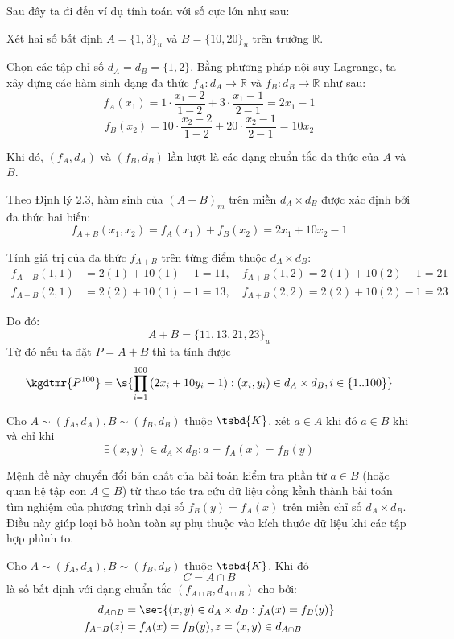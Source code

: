 \par{\noindent Sau đây ta đi đến ví dụ tính toán với số cực lớn như sau:}
\begin{example}
	Xét hai số bất định $A = \{1, 3\}_u$ và $B = \{10, 20\}_u$ trên trường $\mathbb{R}$.
	
	Chọn các tập chỉ số $d_A = d_B = \{1, 2\}$. Bằng phương pháp nội suy Lagrange, ta xây dựng các hàm sinh dạng đa thức $f_A: d_A \to \mathbb{R}$ và $f_B: d_B \to \mathbb{R}$ như sau:
	$$f_A(x_1) = 1 \cdot \frac{x_1 - 2}{1 - 2} + 3 \cdot \frac{x_1 - 1}{2 - 1} = 2x_1 - 1$$
	$$f_B(x_2) = 10 \cdot \frac{x_2 - 2}{1 - 2} + 20 \cdot \frac{x_2 - 1}{2 - 1} = 10x_2$$
	
	Khi đó, $(f_A, d_A)$ và $(f_B, d_B)$ lần lượt là các dạng chuẩn tắc đa thức của $A$ và $B$.
	
	Theo Định lý 2.3, hàm sinh của $(A + B)_m$ trên miền $d_A \times d_B$ được xác định bởi đa thức hai biến:
	$$f_{A+B}(x_1, x_2) = f_A(x_1) + f_B(x_2) = 2x_1 + 10x_2 - 1$$
	
	Tính giá trị của đa thức $f_{A+B}$ trên từng điểm thuộc $d_A \times d_B$:
	\begin{align*}
		f_{A+B}(1, 1) &= 2(1) + 10(1) - 1 = 11, \quad f_{A+B}(1, 2) = 2(1) + 10(2) - 1 = 21 \\
		f_{A+B}(2, 1) &= 2(2) + 10(1) - 1 = 13, \quad f_{A+B}(2, 2) = 2(2) + 10(2) - 1 = 23
	\end{align*}
	
	Do đó:
	$$ A + B = \{11, 13, 21, 23\}_u$$
	Từ đó nếu ta đặt $ P = A+B$ thì ta tính được \[\kgdtmr{P^{100}} = \s{\prod_{i=1}^{100}{(2x_i + 10 y_i  - 1)}: (x_i,y_i) \in d_A \times d_B, i \in \{1..100\}}
	\]
\end{example}
\begin{proposition}
	Cho $A \sim (f_A,d_A), B \sim (f_B,d_B)$ thuộc $\tsbd{K}$, xét $a \in A$ khi đó $a \in B$ khi và chỉ khi \[
	\exists (x,y) \in d_A \times d_B : a=f_A(x)=f_B(y)
	\]
\end{proposition}
\begin{remark}
	Mệnh đề này chuyển đổi bản chất của bài toán kiểm tra phần tử $a \in B$ (hoặc quan hệ tập con $A \subseteq B$) từ thao tác tra cứu dữ liệu cồng kềnh thành bài toán tìm nghiệm của phương trình đại số $f_B(y) = f_A(x)$ trên miền chỉ số $d_A \times d_B$. Điều này giúp loại bỏ hoàn toàn sự phụ thuộc vào kích thước dữ liệu khi các tập hợp phình to.
\end{remark}
\begin{proposition}
	\label{prop:dang_chuan_tac_phep_giao}
	Cho $ A\sim (f_A,d_A), B \sim (f_B,d_B)$ thuộc $\tsbd{K}$. Khi đó \[
		C = A \cap B
	\]
	là số bất định với dạng chuẩn tắc $(f_{A\cap B},d_{A\cap B})$ cho bởi:
	\begin{align*}
		d_{A\cap B} &= \set{(x,y) \in d_A \times d_B : f_A(x) = f_B(y)}  \\
		f_{A\cap B}(z) &= f_A(x) = f_B(y), z=(x,y) \in d_{A\cap B}
	\end{align*}
\end{proposition}

